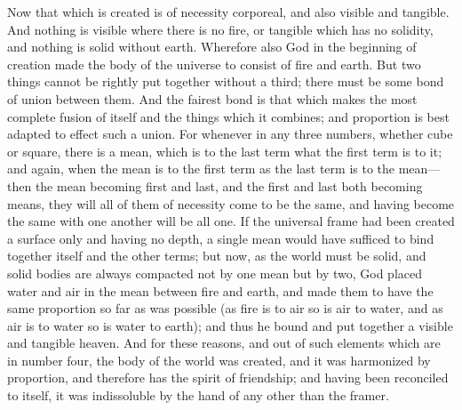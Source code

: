 Now that which is created is of necessity corporeal, and also visible and
tangible. And nothing is visible where there is no fire, or tangible which
has no solidity, and nothing is solid without earth. Wherefore also God in
the beginning of creation made the body of the universe to consist of fire
and earth. But two things cannot be rightly put together without a third;
there must be some bond of union between them. And the fairest bond is
that which makes the most complete fusion of itself and the things which
it combines; and proportion is best adapted to effect such a union. For
whenever in any three numbers, whether cube or square, there is a mean,
which is to the last term what the first term is to it; and again, when
the mean is to the first term as the last term is to the mean—then
the mean becoming first and last, and the first and last both becoming
means, they will all of them of necessity come to be the same, and having
become the same with one another will be all one. If the universal frame
had been created a surface only and having no depth, a single mean would
have sufficed to bind together itself and the other terms; but now, as the
world must be solid, and solid bodies are always compacted not by one mean
but by two, God placed water and air in the mean between fire and earth,
and made them to have the same proportion so far as was possible (as fire
is to air so is air to water, and as air is to water so is water to
earth); and thus he bound and put together a visible and tangible heaven.
And for these reasons, and out of such elements which are in number four,
the body of the world was created, and it was harmonized by proportion,
and therefore has the spirit of friendship; and having been reconciled to
itself, it was indissoluble by the hand of any other than the framer.

